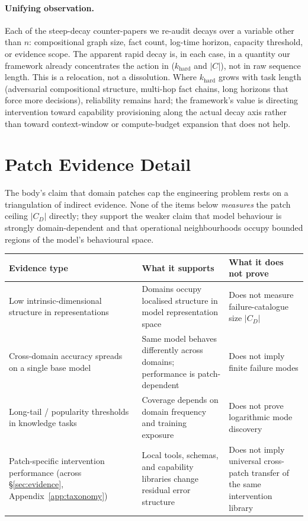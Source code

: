 \documentclass{article}
\theoremstyle{taeplain}
\theoremstyle{taedefn}
\begin{document}
\paragraph{Unifying observation.}
Each of the steep-decay counter-papers we re-audit decays over a variable other than $n$: compositional graph size, fact count, log-time horizon, capacity threshold, or evidence scope. The apparent rapid decay is, in each case, in a quantity our framework already concentrates the action in ($k_{\text{hard}}$ and $|C|$), not in raw sequence length. This is a relocation, not a dissolution. Where $k_{\text{hard}}$ grows with task length (adversarial compositional structure, multi-hop fact chains, long horizons that force more decisions), reliability remains hard; the framework's value is directing intervention toward capability provisioning along the actual decay axis rather than toward context-window or compute-budget expansion that does not help.

\section{Patch Evidence Detail}
\label{app:patch-evidence}

The body's claim that domain patches cap the engineering problem rests on a triangulation of indirect evidence. None of the items below \emph{measures} the patch ceiling $|C_D|$ directly; they support the weaker claim that model behaviour is strongly domain-dependent and that operational neighbourhoods occupy bounded regions of the model's behavioural space.

\begin{center}
\small
\begin{tabular}{p{4.0cm}p{4.5cm}p{4.5cm}}
\toprule
\textbf{Evidence type} & \textbf{What it supports} & \textbf{What it does not prove} \\
\midrule
Low intrinsic-dimensional structure in representations~\citep{park2024linear,li2025stratified} & Domains occupy localised structure in model representation space & Does not measure failure-catalogue size $|C_D|$ \\
\midrule
Cross-domain accuracy spreads on a single base model~\citep{wangy2024mmlupro} & Same model behaves differently across domains; performance is patch-dependent & Does not imply finite failure modes \\
\midrule
Long-tail / popularity thresholds in knowledge tasks~\citep{mallen2023popqa,kandpal2023longtail} & Coverage depends on domain frequency and training exposure & Does not prove logarithmic mode discovery \\
\midrule
Patch-specific intervention performance (across \S\ref{sec:evidence}, Appendix~\ref{app:taxonomy}) & Local tools, schemas, and capability libraries change residual error structure & Does not imply universal cross-patch transfer of the same intervention library \\
\bottomrule
\end{tabular}
\end{center}
\end{document}
